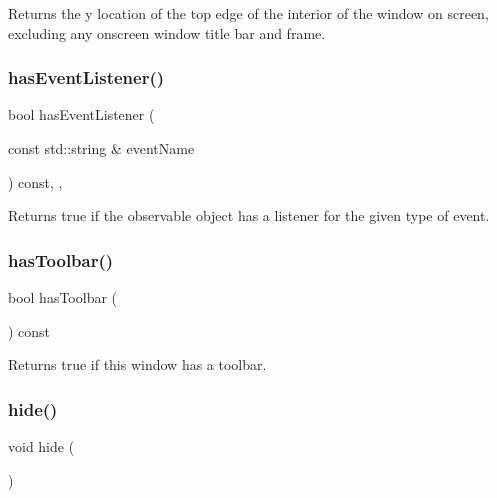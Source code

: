 Returns the y location of the top edge of the interior of the window on screen, excluding any onscreen window title bar and frame. 

\mbox{\label{classGObservable_a9f6faaa25942923bafa1c44020c49fa9}} 
\subsubsection{\texorpdfstring{has\+Event\+Listener()}{hasEventListener()}}
{\footnotesize\ttfamily bool has\+Event\+Listener (\begin{DoxyParamCaption}\item[{const std\+::string \&}]{event\+Name }\end{DoxyParamCaption}) const\hspace{0.3cm}{\ttfamily [protected]}, {\ttfamily [virtual]}, {\ttfamily [inherited]}}



Returns true if the observable object has a listener for the given type of event. 

\mbox{\label{classGWindow_af69d0a7ce84cbbef65e40d861ef097c5}} 
\subsubsection{\texorpdfstring{has\+Toolbar()}{hasToolbar()}}
{\footnotesize\ttfamily bool has\+Toolbar (\begin{DoxyParamCaption}{ }\end{DoxyParamCaption}) const\hspace{0.3cm}{\ttfamily [virtual]}}



Returns true if this window has a toolbar. 

\mbox{\label{classGWindow_ade42eb4da4eb77db85a8d1e4b92e7be4}} 
\subsubsection{\texorpdfstring{hide()}{hide()}}
{\footnotesize\ttfamily void hide (\begin{DoxyParamCaption}{ }\end{DoxyParamCaption})\hspace{0.3cm}{\ttfamily [virtual]}}



